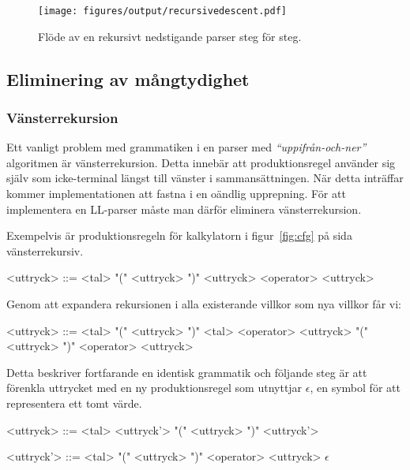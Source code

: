 \begin{figure}[ht]
  \texttt{[image: figures/output/recursivedescent.pdf]}
  \caption{Flöde av en rekursivt nedstigande parser steg för steg.}
  \label{fig:recursivedescent}
\end{figure}

\subsection{Eliminering av mångtydighet}

\subsubsection{Vänsterrekursion}

Ett vanligt problem med grammatiken i en parser med \textit{``uppifrån-och-ner''}
algoritmen är vänsterrekursion. Detta innebär att produktionsregel använder
sig själv som icke-terminal längst till vänster i sammansättningen. När
detta inträffar kommer implementationen att fastna i en oändlig upprepning.
För att implementera en LL-parser måste man därför eliminera vänsterrekursion.

Exempelvis är produktionsregeln för kalkylatorn i figur~\ref{fig:cfg} på sida
\pageref{fig:cfg} vänsterrekursiv.

\setlength{\grammarindent}{5em}
\begin{grammar}
  \singlespace\small%
  \selectfont
  <uttryck> ::= <tal>
    \alt "(" <uttryck> ")"
    \alt <uttryck> <operator> <uttryck>
\end{grammar}

Genom att expandera rekursionen i alla existerande villkor som nya villkor får
vi:

\setlength{\grammarindent}{5em}
\begin{grammar}
  \singlespace\small%
  \selectfont
  <uttryck> ::= <tal>
    \alt "(" <uttryck> ")"
    \alt <tal> <operator> <uttryck>
    \alt "(" <uttryck> ")" <operator> <uttryck>
\end{grammar}

Detta beskriver fortfarande en identisk grammatik och följande steg är att
förenkla uttrycket med en ny produktionsregel som utnyttjar $\epsilon$, en
symbol för att representera ett tomt värde.

\setlength{\grammarindent}{5em}
\begin{grammar}
  \singlespace\small%
  \selectfont
  <uttryck> ::= <tal> <uttryck'>
    \alt "(" <uttryck> ")" <uttryck'>

  <uttryck'> ::= <tal>
    \alt "(" <uttryck> ")"
    \alt <operator> <uttryck>
    \alt $\epsilon$
\end{grammar}

